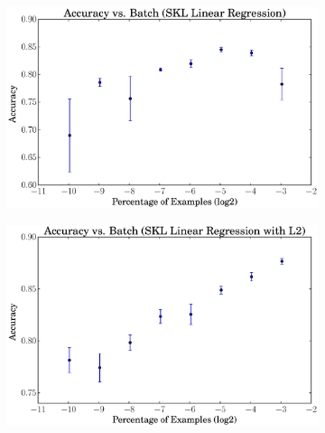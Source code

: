 \documentclass[a4paper, 12pt]{article}
\begin{document}
\begin{figure}[htpb]
    \centering
    \begin{subfigure}[htpb]{0.45\textwidth}
        \includegraphics[width=\textwidth]{acc_vs_batchp_skl_linreg}
        \caption{}
        \label{fig:snt}
    \end{subfigure}
    \begin{subfigure}[htpb]{0.45\textwidth}
        \includegraphics[width=\textwidth]{acc_vs_batchp_skl_linregL2}
        \caption{}
        \label{fig:ret}
    \end{subfigure}
    \hfill %
    \begin{subfigure}[htpb]{0.45\textwidth}

\end{subfigure}
\end{figure}
\end{document}
